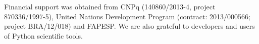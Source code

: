 \documentclass[%
	aip,
	jmp,%
	amsmath,amssymb,
	reprint,%
]{revtex4-1}
\begin{document}



\begin{acknowledgments}
	Financial support was obtained from CNPq (140860/2013-4,
	project 870336/1997-5), United Nations Development Program (contract: 2013/000566; project BRA/12/018) and FAPESP. 
	We are also grateful to developers and users of Python scientific tools.
\end{acknowledgments}


\end{document}
